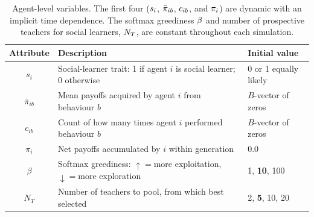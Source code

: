 \documentclass[letterpaper,11.5pt]{scrartcl}
\begin{document}

\begin{table}[h]
  \vspace{2em}
  \caption{Agent-level variables. The first four ($\protect s_i$, $\protect
    \bar\pi_{ib}$, $\protect c_{ib}$,
  and $\protect \pi_i$) are dynamic with an implicit time dependence. The softmax
greediness $\protect \beta$ and number of prospective teachers for social learners,
$\protect N_T$, are constant throughout each simulation.}
    \label{tab:modelParameters}
    \centering \hspace{-1em}
    \begin{tabular}{cp{4.5in}p{1.25in}} \toprule

        Attribute & Description & Initial value \\ 

        \midrule  

        $s_i$  & Social-learner trait: 1 if agent $i$ is social learner; 0 otherwise & 0
        or 1 equally likely \\

        $\bar\pi_{ib}$ & Mean payoffs acquired by agent $i$ from behaviour $b$
                       & $B$-vector of zeros \\

        $c_{ib}$ & Count of how many times agent $i$ performed behaviour $b$ 
              & $B$-vector of zeros \\

        $\pi_i$ & Net payoffs accumulated by $i$ within generation & 0.0 \\

        $\beta$ & Softmax greediness: $\uparrow=$more exploitation, $\downarrow=$more
                    exploration 
               & 1, \textbf{10}, 100 \\
        
        $N_T$    & Number of teachers to pool, from which best selected 
                 & 2, \textbf{5}, 10, 20  \\

        \bottomrule
    \end{tabular}
\end{table}
\end{document}
